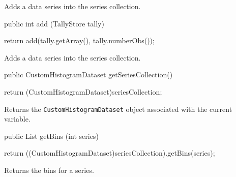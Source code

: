 \begin{tabb}
   Adds a data series into the series collection.
\end{tabb}
\begin{htmlonly}
\end{htmlonly}
\begin{code}

   public int add (TallyStore tally) \begin{hide} {
      return add(tally.getArray(), tally.numberObs());
   }\end{hide}
\end{code}
\begin{tabb}
   Adds a data series into the series collection.
\end{tabb}
\begin{htmlonly}
\end{htmlonly}
\begin{code}

   public CustomHistogramDataset getSeriesCollection() \begin{hide} {
      return (CustomHistogramDataset)seriesCollection;
   }\end{hide}
\end{code}
\begin{tabb}
   Returns the \texttt{CustomHistogramDataset} object associated with the current variable.
\end{tabb}
\begin{htmlonly}
\end{htmlonly}
\begin{code}

   public List getBins (int series) \begin{hide} {
      return ((CustomHistogramDataset)seriesCollection).getBins(series);
   }\end{hide}
\end{code}
\begin{tabb}
   Returns the bins for a series.
\end{tabb}
\begin{htmlonly}
\end{htmlonly}
